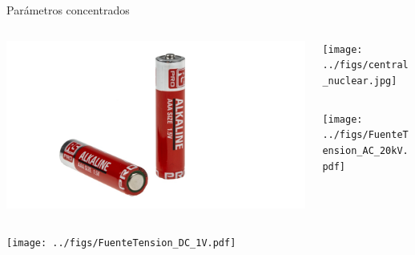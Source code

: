 \documentclass[aspectratio=169, xcolor={usenames,svgnames,dvipsnames}]{beamer}
\begin{document}
\begin{frame}{Parámetros concentrados}
    \begin{columns}
    \begin{column}{0.4\columnwidth}
        \begin{column}{0.2\columnwidth}
        \begin{center}
            \hspace*{-12mm}\includegraphics[height=0.4\textheight]{../figs/pila_alcalina.jpg} 
        \end{center}
        \end{column}  
        \begin{column}{0.05\columnwidth}
            \hspace*{2mm}\scalebox{2}{$\rightarrow$} %
        \end{column} 
        \begin{column}{0.3\columnwidth}
            \hspace*{-5mm}\texttt{[image: ../figs/FuenteTension\_DC\_1V.pdf]}
        \end{column}         
    \end{column}      
    \vrule
    \begin{column}{0.6\columnwidth}
        \begin{column}{0.35\columnwidth}
        \begin{center}
            \hspace*{5mm}\texttt{[image: ../figs/central\_nuclear.jpg]} 
        \end{center}
        \end{column}  
        \begin{column}{0.05\columnwidth}
            \hspace*{4mm}\scalebox{2}{$\rightarrow$} %
        \end{column} 
        \begin{column}{0.2\columnwidth}
            \hspace*{-9mm}\texttt{[image: ../figs/FuenteTension\_AC\_20kV.pdf]}
        \end{column} 
    \end{column}  
    \end{columns}
    
\end{frame}
\end{document}
